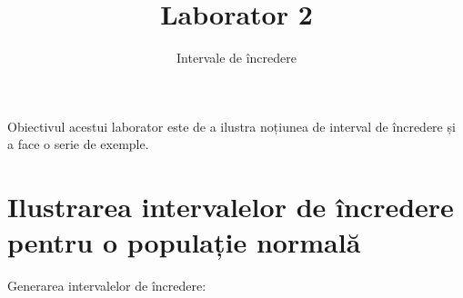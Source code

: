 \documentclass[]{article}
\title{Laborator 2}
\subtitle{Intervale de încredere}
\author{}
\date{}
\begin{document}
\maketitle

\thispagestyle{fancy}

Obiectivul acestui laborator este de a ilustra noțiunea de interval de
încredere și a face o serie de exemple.

\section{Ilustrarea intervalelor de încredere pentru o populație
normală}\label{ilustrarea-intervalelor-de-incredere-pentru-o-populatie-normala}

Generarea intervalelor de încredere:
\end{document}
